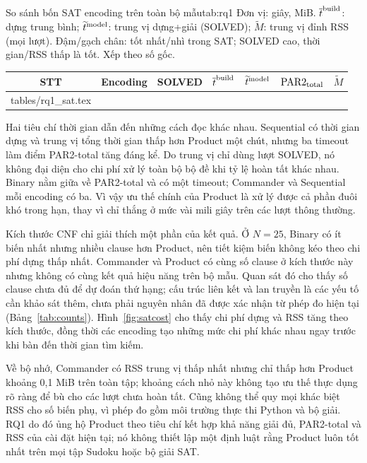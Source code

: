 \documentclass[a4paper]{cas-sc}
\makeatletter
\newcommand{\PAR}{\operatorname{PAR2}_{\rm total}}
\newcommand{\tableinput}[1]{\@@input #1 }
\makeatother
\begin{document}
\begin{reporttable}{So sánh bốn SAT encoding trên toàn bộ mẫu}{tab:rq1}{%
Đơn vị: giây, MiB. $\overline t^{\rm build}$: dựng trung bình; $\widetilde t^{\rm model}$: trung vị dựng+giải (SOLVED); $\widetilde M$: trung vị đỉnh RSS (mọi lượt). Đậm/gạch chân: tốt nhất/nhì trong SAT; SOLVED cao, thời gian/RSS thấp là tốt. Xếp theo số gốc.}
\begin{tabular}{|c|l|c|c|c|c|c|}
\hline
\textbf{STT} & \textbf{Encoding} & \textbf{SOLVED} & $\overline t^{\rm build}$ & $\widetilde t^{\rm model}$ & $\PAR$ & $\widetilde M$\\\hline
\tableinput{tables/rq1_sat.tex}\hline
\end{tabular}
\end{reporttable}

Hai tiêu chí thời gian dẫn đến những cách đọc khác nhau. Sequential có thời gian dựng và trung vị tổng thời gian thấp hơn Product một chút, nhưng ba timeout làm điểm PAR2-total tăng đáng kể. Do trung vị chỉ dùng lượt SOLVED, nó không đại diện cho chi phí xử lý toàn bộ bộ đề khi tỷ lệ hoàn tất khác nhau. Binary nằm giữa về PAR2-total và có một timeout; Commander và Sequential mỗi encoding có ba. Vì vậy ưu thế chính của Product là xử lý được cả phần đuôi khó trong hạn, thay vì chỉ thắng ở mức vài mili giây trên các lượt thông thường.

Kích thước CNF chỉ giải thích một phần của kết quả. Ở $N=25$, Binary có ít biến nhất nhưng nhiều clause hơn Product, nên tiết kiệm biến không kéo theo chi phí dựng thấp nhất. Commander và Product có cùng số clause ở kích thước này nhưng không có cùng kết quả hiệu năng trên bộ mẫu. Quan sát đó cho thấy số clause chưa đủ để dự đoán thứ hạng; cấu trúc liên kết và lan truyền là các yếu tố cần khảo sát thêm, chưa phải nguyên nhân đã được xác nhận từ phép đo hiện tại (Bảng~\ref{tab:counts}). Hình~\ref{fig:satcost} cho thấy chi phí dựng và RSS tăng theo kích thước, đồng thời các encoding tạo những mức chi phí khác nhau ngay trước khi bàn đến thời gian tìm kiếm.
\begin{reportfigure}
\centering
\caption{Chi phí của bốn SAT encoding theo kích thước: (a) thời gian dựng mô hình trung bình; (b) trung vị đỉnh RSS. Chú giải chung nằm dưới hai biểu đồ. Mỗi điểm tổng hợp 90 lượt.}
\label{fig:satcost}
\end{reportfigure}
Về bộ nhớ, Commander có RSS trung vị thấp nhất nhưng chỉ thấp hơn Product khoảng 0,1 MiB trên toàn tập; khoảng cách nhỏ này không tạo ưu thế thực dụng rõ ràng để bù cho các lượt chưa hoàn tất. Cũng không thể quy mọi khác biệt RSS cho số biến phụ, vì phép đo gồm môi trường thực thi Python và bộ giải. RQ1 do đó ủng hộ Product theo tiêu chí kết hợp khả năng giải đủ, PAR2-total và RSS của cài đặt hiện tại; nó không thiết lập một định luật rằng Product luôn tốt nhất trên mọi tập Sudoku hoặc bộ giải SAT.
\end{document}
